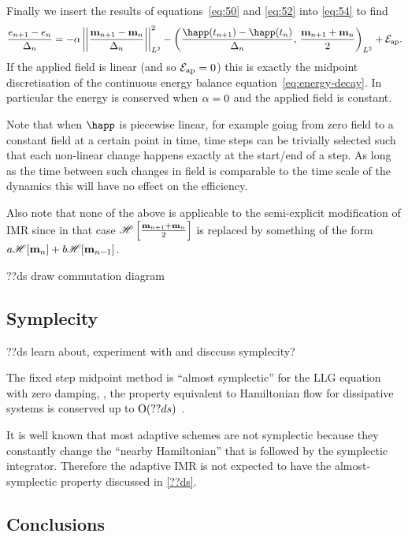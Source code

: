 Finally we insert the results of equations~\cref{eq:50} and \cref{eq:52} into \cref{eq:54} to find
\begin{equation}
  \frac{\e_{n+1} - \e_n}{\dtn}
  = -\dampc \ltnorm{\mpdmdt}^2
  - \ltip{\frac{\happ(t_{n+1}) -\happ(t_n)}{\dtn}}{\frac{\mv_{n+1} + \mv_{n}}{2}}
  + \happerror.
  \label{eqn:imr-llg-energy}
\end{equation}
If the applied field is linear (and so $\mathcal{E}_\text{ap} = 0$) this is exactly the midpoint discretisation of the continuous energy balance equation~\cref{eq:energy-decay}.
In particular the energy is conserved when $\alpha = 0$ and the applied field is constant.

Note that when $\happ$ is piecewise linear, for example going from zero field to a constant field at a certain point in time, time steps can be trivially selected such that each non-linear change happens exactly at the start/end of a step.
As long as the time between such changes in field is comparable to the time scale of the dynamics this will have no effect on the efficiency.

Also note that none of the above is applicable to the semi-explicit modification of IMR since in that case $\mathscr{H} \left[ \frac{\mathbf{m}_{n+1} + \mathbf{m}_n}{2} \right]$ is replaced by something of the form $a\mathscr{H} {\left[ \mathbf{m}_n \right]} + b\mathscr{H} {\left[ \mathbf{m}_{n-1} \right]}$.

??ds draw commutation diagram

\subsection{Symplecity}

??ds learn about, experiment with and disccuss symplecity?

The fixed step midpoint method is ``almost symplectic'' for the LLG equation with zero damping, , \ie the property equivalent to Hamiltonian flow for  dissipative systems is conserved up to $\text{O}{\left( ??ds \right)}$ \cite{DAquino2005} \cite{Austin1993}.

It is well known that most adaptive schemes are not symplectic\cite[91]{Iserles2009} because they constantly change the ``nearby Hamiltonian'' that is followed by the symplectic integrator.
Therefore the adaptive IMR is not expected to have the almost-symplectic property discussed in \cref{??ds}.


\subsection{Conclusions}

